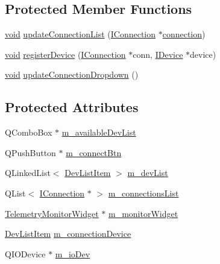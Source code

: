 \subsection*{\-Protected \-Member \-Functions}
\begin{DoxyCompactItemize}
\item 
\hyperlink{group___u_a_v_objects_plugin_ga444cf2ff3f0ecbe028adce838d373f5c}{void} \hyperlink{group___core_plugin_ga68a1ceabeebd789c2e750636ac621dd3}{update\-Connection\-List} (\hyperlink{class_core_1_1_i_connection}{\-I\-Connection} $\ast$\hyperlink{group___i_p_conn_plugin_ga75cb9b33b52928c030806876f2c2f439}{connection})
\item 
\hyperlink{group___u_a_v_objects_plugin_ga444cf2ff3f0ecbe028adce838d373f5c}{void} \hyperlink{group___core_plugin_ga385cde399fab0cd3df254656dfe99179}{register\-Device} (\hyperlink{class_core_1_1_i_connection}{\-I\-Connection} $\ast$conn, \hyperlink{class_core_1_1_i_device}{\-I\-Device} $\ast$device)
\item 
\hyperlink{group___u_a_v_objects_plugin_ga444cf2ff3f0ecbe028adce838d373f5c}{void} \hyperlink{group___core_plugin_ga822df7d9f4473a60eec505d04a52a4b6}{update\-Connection\-Dropdown} ()
\end{DoxyCompactItemize}
\subsection*{\-Protected \-Attributes}
\begin{DoxyCompactItemize}
\item 
\-Q\-Combo\-Box $\ast$ \hyperlink{group___core_plugin_ga41f481dd82dd9c22a44f9f8c3fb67b13}{m\-\_\-available\-Dev\-List}
\item 
\-Q\-Push\-Button $\ast$ \hyperlink{group___core_plugin_gae7f2456d42992a7c1979e22333ef8c8c}{m\-\_\-connect\-Btn}
\item 
\-Q\-Linked\-List$<$ \hyperlink{class_core_1_1_dev_list_item}{\-Dev\-List\-Item} $>$ \hyperlink{group___core_plugin_ga59dba38b0aaf7818a55f5324e04cbfb4}{m\-\_\-dev\-List}
\item 
\-Q\-List$<$ \hyperlink{class_core_1_1_i_connection}{\-I\-Connection} $\ast$ $>$ \hyperlink{group___core_plugin_ga3fc983f808dffe4688e191179b08008b}{m\-\_\-connections\-List}
\item 
\hyperlink{class_telemetry_monitor_widget}{\-Telemetry\-Monitor\-Widget} $\ast$ \hyperlink{group___core_plugin_ga1c7867a16d4a6ee88c874f5e39e0dae8}{m\-\_\-monitor\-Widget}
\item 
\hyperlink{class_core_1_1_dev_list_item}{\-Dev\-List\-Item} \hyperlink{group___core_plugin_ga37d57c467eac74260d1ca5c4ec46c149}{m\-\_\-connection\-Device}
\item 
\-Q\-I\-O\-Device $\ast$ \hyperlink{group___core_plugin_gae83fe34fd2dab9f0c6459abbfcd6be27}{m\-\_\-io\-Dev}
\end{DoxyCompactItemize}


